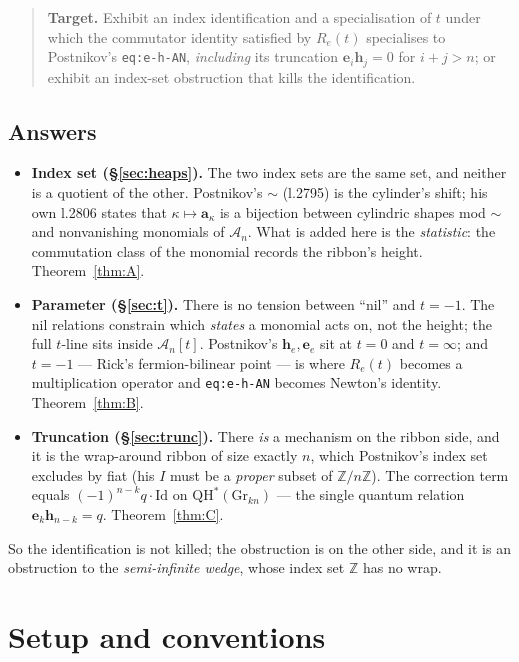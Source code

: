 \documentclass[11pt]{article}
\theoremstyle{plain}
\theoremstyle{definition}
\newcommand{\A}{\mathscr{A}}
\newcommand{\QH}{\mathrm{QH}^*}
\newcommand{\Gr}{\mathrm{Gr}}
\newcommand{\ZZ}{\mathbb{Z}}
\begin{document}
\begin{quote}
\textbf{Target.} Exhibit an index identification and a specialisation of
$t$ under which the commutator identity satisfied by $R_e(t)$ specialises
to Postnikov's \texttt{eq:e-h-AN}, \emph{including} its truncation
$\mathbf e_i\mathbf h_j=0$ for $i+j>n$; or exhibit an index-set
obstruction that kills the identification.
\end{quote}

\subsection*{Answers}

\begin{itemize}
\item \textbf{Index set (\S\ref{sec:heaps}).}  The two index sets are the
  same set, and neither is a quotient of the other.  Postnikov's $\sim$
  (l.2795) is the cylinder's shift; his own l.2806 states that
  $\kappa\mapsto\mathbf a_\kappa$ is a bijection between cylindric shapes
  mod $\sim$ and nonvanishing monomials of $\A_n$.  What is added here is
  the \emph{statistic}: the commutation class of the monomial records the
  ribbon's height.  Theorem~\ref{thm:A}.
\item \textbf{Parameter (\S\ref{sec:t}).}  There is no tension between
  ``nil'' and $t=-1$.  The nil relations constrain which \emph{states} a
  monomial acts on, not the height; the full $t$-line sits inside
  $\A_n[t]$.  Postnikov's $\mathbf h_e,\mathbf e_e$ sit at $t=0$ and
  $t=\infty$; and $t=-1$ --- Rick's fermion-bilinear point --- is where
  $R_e(t)$ becomes a multiplication operator and \texttt{eq:e-h-AN}
  becomes Newton's identity.  Theorem~\ref{thm:B}.
\item \textbf{Truncation (\S\ref{sec:trunc}).}  There \emph{is} a
  mechanism on the ribbon side, and it is the wrap-around ribbon of size
  exactly $n$, which Postnikov's index set excludes by fiat (his $I$ must
  be a \emph{proper} subset of $\ZZ/n\ZZ$).  The correction term equals
  $(-1)^{n-k}q\cdot\mathrm{Id}$ on $\QH(\Gr_{kn})$ --- the single quantum
  relation $\mathbf e_k\mathbf h_{n-k}=q$.  Theorem~\ref{thm:C}.
\end{itemize}

So the identification is not killed; the obstruction is on the other
side, and it is an obstruction to the \emph{semi-infinite wedge}, whose
index set $\ZZ$ has no wrap.

\section{Setup and conventions}
\end{document}
